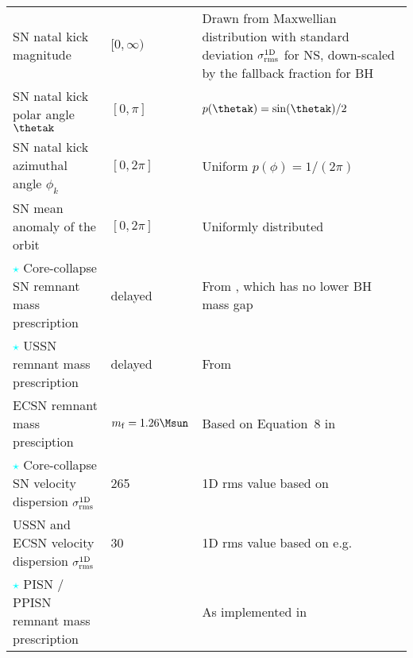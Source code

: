 \begin{table*}
{\begin{tabular}{lll}
%
\ac{SN} natal kick magnitude \vk                          									& $[0, \infty)$\kms & Drawn from Maxwellian distribution with standard deviation $\sigma_{\rm{rms}}^{\rm{1D}}$ for \ac{NS}, down-scaled by the fallback fraction for \ac{BH}          \\
%
 \ac{SN} natal kick polar angle $\thetak$          											& $[0, \pi]$                        & $p(\thetak) = \sin(\thetak)/2$ \\
%
 \ac{SN} natal kick azimuthal angle $\phi_k$                           					  	& $[0, 2\pi]$                        & Uniform $p(\phi) = 1/ (2 \pi)$   \\
%
 \ac{SN} mean anomaly of the orbit                    											&     $[0, 2\pi]$                             & Uniformly distributed  \\
{\hspace{-.35cm}\Large{\textcolor{cyan}{$\star$}}}{\hspace{+.02cm}} Core-collapse  \ac{SN} remnant mass prescription          									     &  delayed                     &  From \citep{2012ApJ...749...91F}, which  has no lower \ac{BH} mass gap  \\%
%
{\hspace{-.35cm}\Large{\textcolor{cyan}{$\star$}}}{\hspace{+.02cm}} USSN  remnant mass prescription          									     &  delayed                     &  From \citep{2012ApJ...749...91F}   \\%
%
ECSN  remnant mass presciption                        												&                                 $m_{\rm{f}} = 1.26\Msun$ &      Based on Equation~8 in \citet{1996ApJ...457..834T}          \\
%
{\hspace{-.35cm}\Large{\textcolor{cyan}{$\star$}}}{\hspace{+.02cm}} Core-collapse  \ac{SN}  velocity dispersion $\sigma_{\rm{rms}}^{\rm{1D}}$ 			& 265\kms           & 1D rms value based on              \citet{2005MNRAS.360..974H}                          \\
%
 USSN  and ECSN  velocity dispersion $\sigma_{\rm{rms}}^{\rm{1D}}$ 							 	& 30\kms             &            1D rms value based on e.g.    \citet{2002ApJ...571L..37P,2004ApJ...612.1044P}    \\
%
{\hspace{-.35cm}\Large{\textcolor{cyan}{$\star$}}}{\hspace{+.02cm}} PISN / PPISN remnant mass prescription               											& \citet{2019ApJ...882...36M}                    &       As implemented in \citet{2019ApJ...882..121S}      \\

\end{tabular}}
\end{table*}
